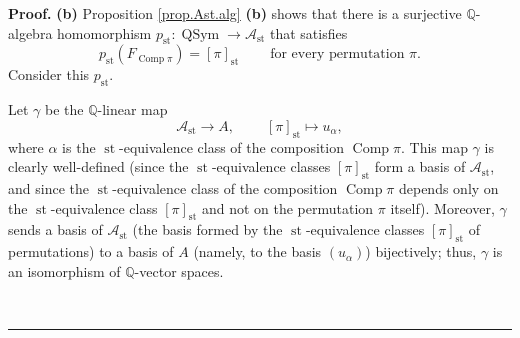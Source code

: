 \documentclass[numbers=enddot,12pt,final,onecolumn,notitlepage]{scrartcl}%
\theoremstyle{definition}
\newenvironment{proof}[1][Proof]{\noindent\textbf{#1.} }{\ \rule{0.5em}{0.5em}}
\newenvironment{verlong}{}{}
\begin{document}
\begin{verlong}
\begin{proof}
\textbf{(b)} Proposition \ref{prop.Ast.alg} \textbf{(b)} shows that there is a
surjective $\mathbb{Q}$-algebra homomorphism $p_{\operatorname*{st}%
}:\operatorname*{QSym}\rightarrow\mathcal{A}_{\operatorname*{st}}$ that
satisfies
\begin{equation}
p_{\operatorname*{st}}\left(  F_{\operatorname*{Comp}\pi}\right)  =\left[
\pi\right]  _{\operatorname*{st}}\ \ \ \ \ \ \ \ \ \ \text{for every
permutation }\pi. \label{pf.thm.4.3.b.pst}%
\end{equation}
Consider this $p_{\operatorname*{st}}$.

Let $\gamma$ be the $\mathbb{Q}$-linear map%
\[
\mathcal{A}_{\operatorname*{st}}\rightarrow A,\ \ \ \ \ \ \ \ \ \ \left[
\pi\right]  _{\operatorname*{st}}\mapsto u_{\alpha},
\]
where $\alpha$ is the $\operatorname*{st}$-equivalence class of the
composition $\operatorname*{Comp}\pi$. This map $\gamma$ is clearly
well-defined (since the $\operatorname*{st}$-equivalence classes $\left[
\pi\right]  _{\operatorname*{st}}$ form a basis of $\mathcal{A}%
_{\operatorname*{st}}$, and since the $\operatorname*{st}$-equivalence class
of the composition $\operatorname*{Comp}\pi$ depends only on the
$\operatorname*{st}$-equivalence class $\left[  \pi\right]
_{\operatorname*{st}}$ and not on the permutation $\pi$ itself). Moreover,
$\gamma$ sends a basis of $\mathcal{A}_{\operatorname*{st}}$ (the basis formed
by the $\operatorname*{st}$-equivalence classes $\left[  \pi\right]
_{\operatorname*{st}}$ of permutations) to a basis of $A$ (namely, to the
basis $\left(  u_{\alpha}\right)  $) bijectively; thus, $\gamma$ is an
isomorphism of $\mathbb{Q}$-vector spaces.


\end{proof}
\end{verlong}
\end{document}
